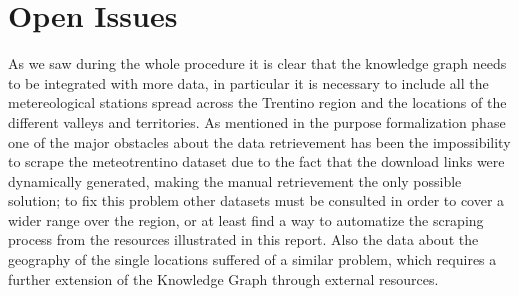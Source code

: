 \section{Open Issues}
As we saw during the whole procedure it is clear that the knowledge graph needs to be
integrated with more data, in particular it is necessary to include all the metereological
stations spread across the Trentino region and the locations of the different valleys and
territories. As mentioned in the purpose formalization phase one of the major obstacles about
the data retrievement has been the impossibility to scrape the meteotrentino dataset due to the
fact that the download links were dynamically generated, making the manual retrievement the only
possible solution; to fix this problem other datasets must be consulted in order to cover a wider
range over the region, or at least find a way to automatize the scraping process from the resources
illustrated in this report. Also the data about the geography of the single locations suffered of
a similar problem, which requires a further extension of the Knowledge Graph through external resources. 
